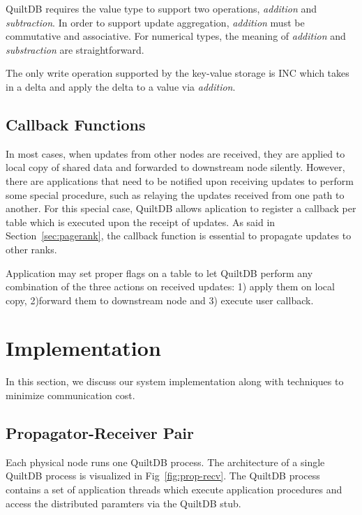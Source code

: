 \documentclass{acm_proc_article-sp}
\begin{document}
QuiltDB requires the value type to support two operations, \emph{addition} and
\emph{subtraction}. In order to support update aggregation, \emph{addition} must
 be commutative and associative. For numerical types,  the meaning of
\emph{addition} and \emph{substraction} are straightforward.

The only write operation supported by the key-value storage is INC which takes
in a delta and apply the delta to a value via \emph{addition}.

\subsection{Callback Functions}
\label{sec:callback}

In most cases, when updates from other nodes are received, they are applied to
local copy of shared data and forwarded to downstream node silently.
However, there are applications that need to be notified upon receiving updates
to perform some special procedure, such as relaying the updates received from
one path to another. For this special case, QuiltDB allows aplication to
register a callback per table which is executed upon the receipt of updates. As
said in Section~\ref{sec:pagerank}, the callback function is essential to
propagate updates to other ranks.

Application may set proper flags on a table to let QuiltDB perform any
combination of the three actions on received updates: 1) apply them on local
copy, 2)forward them to downstream node and 3) execute user callback.

\section{Implementation}
In this section, we discuss our system implementation along with techniques to
minimize communication cost.

\subsection{Propagator-Receiver Pair}

Each physical node runs one QuiltDB process. The architecture of a single
QuiltDB process is visualized in Fig~\ref{fig:prop-recv}.  The QuiltDB process
contains a set of application threads which execute application procedures and
access the distributed paramters via the QuiltDB stub.
\end{document}
